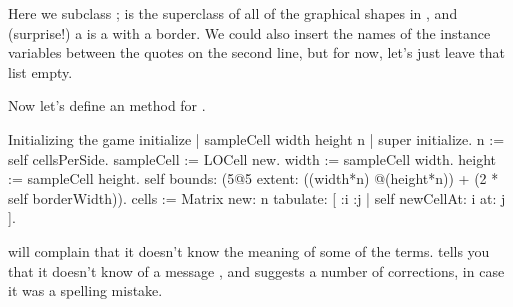 \documentclass[a4paper,10pt,twoside]{book}
\begin{document}
Here we subclass ;  is the superclass of all of the graphical shapes in \pharo, and (surprise!) a  is a  with a border.  
We could also insert the names of the instance variables between the quotes on the second line, but for now, let's just leave that list empty.

Now let's define an  method for .


\begin{numMethod}[sbegameinitialize]{Initializing the game}
initialize
   | sampleCell width height n |
   super initialize.
   n := self cellsPerSide.
   sampleCell := LOCell new.
   width := sampleCell width.
   height := sampleCell height.
   self bounds: (5@5 extent: ((width*n) @(height*n)) + (2 * self borderWidth)).
   cells := Matrix new: n tabulate: [ :i :j | self newCellAt: i at: j ].
\end{numMethod}


\pharo will complain that it doesn't know the meaning of some of the terms.
\pharo tells you that it doesn't know of a message , and suggests a number of corrections, in case it was a spelling mistake.
\end{document}
